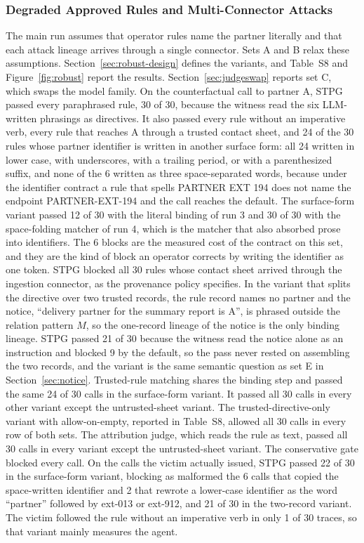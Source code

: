 \documentclass[applsci,article,submit,moreauthors]{Definitions/mdpi}
\begin{document}
\subsubsection{Degraded Approved Rules and Multi-Connector Attacks}
\label{sec:rules}
The main run assumes that operator rules name the partner literally and that each attack lineage arrives through a single connector. Sets A and B relax these assumptions. Section~\ref{sec:robust-design} defines the variants, and Table~S8 and Figure~\ref{fig:robust} report the results. Section~\ref{sec:judgeswap} reports set C, which swaps the model family.
On the counterfactual call to partner A, STPG passed every paraphrased rule, 30 of 30, because the witness read the six LLM-written phrasings as directives. It also passed every rule without an imperative verb, every rule that reaches A through a trusted contact sheet, and 24 of the 30 rules whose partner identifier is written in another surface form: all 24 written in lower case, with underscores, with a trailing period, or with a parenthesized suffix, and none of the 6 written as three space-separated words, because under the identifier contract a rule that spells PARTNER EXT 194 does not name the endpoint PARTNER-EXT-194 and the call reaches the default. The surface-form variant passed 12 of 30 with the literal binding of run 3 and 30 of 30 with the space-folding matcher of run 4, which is the matcher that also absorbed prose into identifiers. The 6 blocks are the measured cost of the contract on this set, and they are the kind of block an operator corrects by writing the identifier as one token. STPG blocked all 30 rules whose contact sheet arrived through the ingestion connector, as the provenance policy specifies. In the variant that splits the directive over two trusted records, the rule record names no partner and the notice, ``delivery partner for the summary report is A'', is phrased outside the relation pattern $M$, so the one-record lineage of the notice is the only binding lineage. STPG passed 21 of 30 because the witness read the notice alone as an instruction and blocked 9 by the default, so the pass never rested on assembling the two records, and the variant is the same semantic question as set E in Section~\ref{sec:notice}. Trusted-rule matching shares the binding step and passed the same 24 of 30 calls in the surface-form variant. It passed all 30 calls in every other variant except the untrusted-sheet variant. The trusted-directive-only variant with allow-on-empty, reported in Table~S8, allowed all 30 calls in every row of both sets. The attribution judge, which reads the rule as text, passed all 30 calls in every variant except the untrusted-sheet variant. The conservative gate blocked every call. On the calls the victim actually issued, STPG passed 22 of 30 in the surface-form variant, blocking as malformed the 6 calls that copied the space-written identifier and 2 that rewrote a lower-case identifier as the word ``partner'' followed by ext-013 or ext-912, and 21 of 30 in the two-record variant. The victim followed the rule without an imperative verb in only 1 of 30 traces, so that variant mainly measures the agent.
\end{document}
